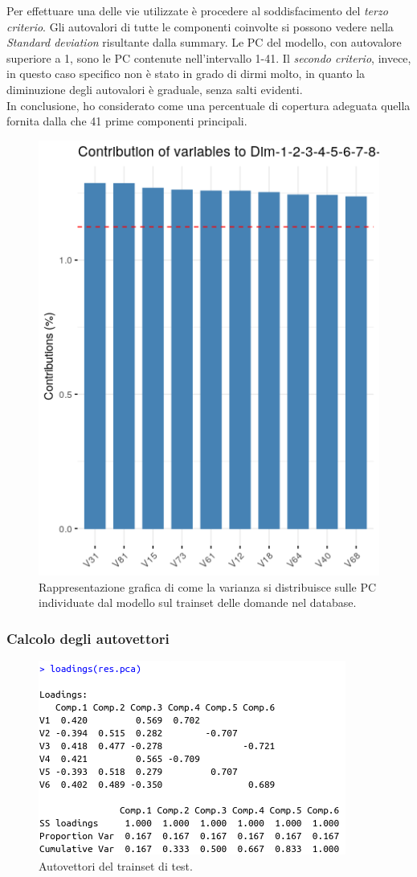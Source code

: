 Per effettuare una delle vie utilizzate \`e procedere al soddisfacimento del \textit{terzo criterio}. Gli autovalori di tutte le componenti coinvolte si possono vedere nella \textit{Standard deviation} risultante dalla summary. Le PC del modello, con autovalore superiore a 1, sono le PC contenute nell'intervallo 1-41.
Il \textit{secondo criterio}, invece, in questo caso specifico non \`e stato in grado di dirmi molto,  in quanto la diminuzione degli autovalori \`e graduale, senza salti evidenti.\\
In conclusione, ho considerato come una percentuale di copertura adeguata quella fornita dalla che 41 prime componenti principali.
\begin{figure}[H]
\centering
	\includegraphics[width=0.60\linewidth]{../../PCA/plot/varianza-complessiva_rete-db.png}
	\caption{Rappresentazione grafica di come la varianza si distribuisce sulle PC individuate dal modello sul trainset delle domande nel database.}
\end{figure}

\subsubsection{Calcolo degli autovettori}
\label{Calcolo degli autovettori}

\begin{figure}[H]
\centering
	\includegraphics[width=0.60\linewidth]{../../PCA/plot/loadings_rete-prova.png}
	\caption{Autovettori del trainset di test.}
\end{figure}

